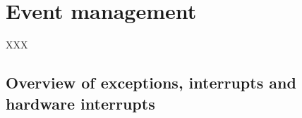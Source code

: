 %
%
%
%
%
%

%
%

\chapter{Event management}

XXX

\newpage

%
%

\section{Overview of exceptions, interrupts and hardware interrupts}

